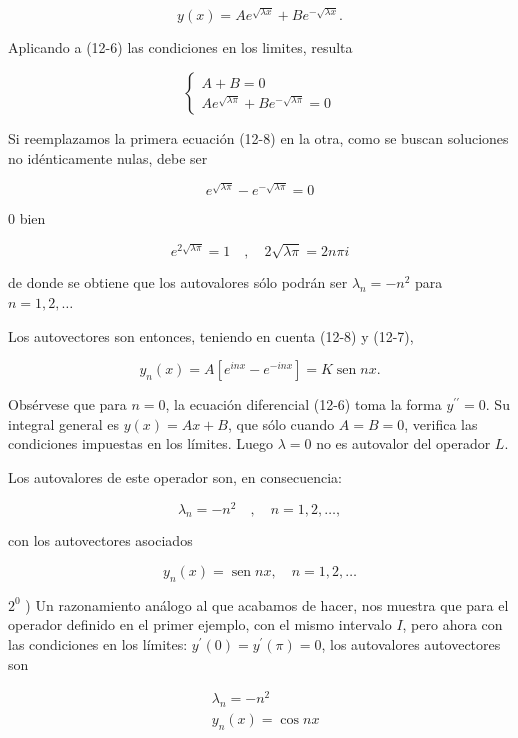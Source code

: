 \documentclass[10pt]{article}
\theoremstyle{plain}
\theoremstyle{definition}
\theoremstyle{remark}
\begin{document}
\begin{equation*}
y(x)=A e^{\sqrt{\lambda x}}+B e^{-\sqrt{\lambda x}} . \tag{12-7}
\end{equation*}


Aplicando a (12-6) las condiciones en los limites, resulta

\[
\left\{\begin{array}{l}
A+B=0  \tag{12-8}\\
A e^{\sqrt{\lambda \pi}}+B e^{-\sqrt{\lambda \pi}}=0
\end{array}\right.
\]

Si reemplazamos la primera ecuación (12-8) en la otra, como se buscan soluciones no idénticamente nulas, debe ser

$$
e^{\sqrt{\lambda \pi}}-e^{-\sqrt{\lambda \pi}}=0
$$

0 bien

$$
e^{2 \sqrt{\lambda \pi}}=1 \quad, \quad 2 \sqrt{\lambda \pi}=2 n \pi i
$$

de donde se obtiene que los autovalores sólo podrán ser $\lambda_{n}=-n^{2}$ para $n=1,2, \ldots$

Los autovectores son entonces, teniendo en cuenta (12-8) y (12-7),

$$
y_{n}(x)=A\left[e^{i n x}-e^{-i n x}\right]=K \operatorname{sen} n x .
$$

Obsérvese que para $n=0$, la ecuación diferencial (12-6) toma la forma $y^{\prime \prime}=0$. Su integral general es $y(x)=A x+B$, que sólo cuando $A=B=0$, verifica las condiciones impuestas en los límites. Luego $\lambda=0$ no es autovalor del operador $L$.

Los autovalores de este operador son, en consecuencia:


\begin{equation*}
\lambda_{n}=-n^{2} \quad, \quad n=1,2, \ldots, \tag{12-9}
\end{equation*}


con los autovectores asociados


\begin{equation*}
y_{n}(x)=\operatorname{sen} n x, \quad n=1,2, \ldots \tag{12-9'}
\end{equation*}


$2^{0}$ ) Un razonamiento análogo al que acabamos de hacer, nos muestra que para el operador definido en el primer ejemplo, con el mismo intervalo $I$, pero ahora con las condiciones en los límites: $y^{\prime}(0)=y^{\prime}(\pi)=0$, los autovalores autovectores son

$$
\begin{aligned}
& \lambda_{n}=-n^{2} \\
& y_{n}(x)=\cos n x
\end{aligned}
$$
\end{document}
